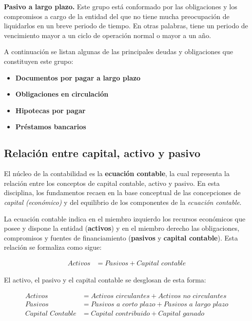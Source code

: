 \documentclass[12pt]{article}
\begin{document}
			\textbf{Pasivo a largo plazo.} Este grupo está conformado por las obligaciones y los compromisos a cargo de la entidad del que no tiene mucha preocupación de liquidarlos en un breve periodo de tiempo. En otras palabras, tiene un periodo de vencimiento mayor a un ciclo de operación normal o mayor a un año.

			A continuación se listan algunas de las principales deudas y obligaciones que constituyen este grupo:

			\begin{itemize}
				\item \textbf{Documentos por pagar a largo plazo}
				\item \textbf{Obligaciones en circulación}
				\item \textbf{Hipotecas por pagar}
				\item \textbf{Préstamos bancarios}
			\end{itemize}

	\subsection{Relación entre capital, activo y pasivo}

	El núcleo de la contabilidad es la \textbf{ecuación contable}, la cual representa la relación entre los conceptos de capital contable, activo y pasivo. En esta disciplina, los fundamentos recaen en la base conceptual de las concepciones de \emph{capital (económico)} y del equilibrio de los componentes de la \emph{ecuación contable}.

	La ecuación contable indica en el miembro izquierdo los recursos económicos que posee y dispone la entidad (\textbf{activos}) y en el miembro derecho las obligaciones, compromisos y fuentes de financiamiento (\textbf{pasivos} y \textbf{capital contable}). Esta relación se formaliza como sigue:

	\begin{align*}
		\textit{Activos} &= \textit{Pasivos} + \textit{Capital contable}
	\end{align*}

	El activo, el pasivo y el capital contable se desglosan de esta forma:

	\begin{align*}
		\textit{Activos} &= \textit{Activos circulantes} + \textit{Activos no circulantes} \\
		\textit{Pasivos} &= \textit{Pasivos a corto plazo} + \textit{Pasivos a largo plazo} \\
		\textit{Capital Contable} &= \textit{Capital contribuido} + \textit{Capital ganado}
	\end{align*}	
\end{document}
